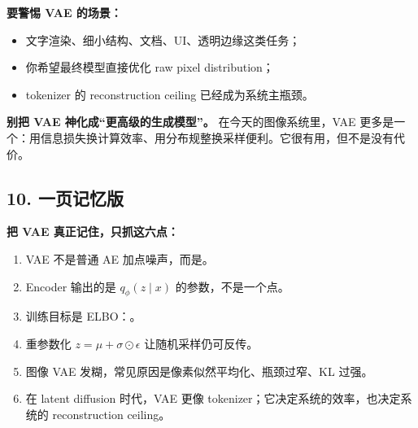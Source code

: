 \textbf{要警惕 VAE 的场景：}

\begin{itemize}[leftmargin=1.5em]
  \item 文字渲染、细小结构、文档、UI、透明边缘这类任务；
  \item 你希望最终模型直接优化 raw pixel distribution；
  \item tokenizer 的 reconstruction ceiling 已经成为系统主瓶颈。
\end{itemize}

\begin{warnbox}
\textbf{别把 VAE 神化成“更高级的生成模型”。} 在今天的图像系统里，VAE 更多是一个：用信息损失换计算效率、用分布规整换采样便利。它很有用，但不是没有代价。
\end{warnbox}

\subsection{10. 一页记忆版}

\begin{summarybox}
\textbf{把 VAE 真正记住，只抓这六点：}
\begin{enumerate}[leftmargin=1.8em]
  \item VAE 不是普通 AE 加点噪声，而是。
  \item Encoder 输出的是 $q_\phi(z\mid x)$ 的参数，不是一个点。
  \item 训练目标是 ELBO：。
  \item 重参数化 $z=\mu+\sigma\odot\epsilon$ 让随机采样仍可反传。
  \item 图像 VAE 发糊，常见原因是像素似然平均化、瓶颈过窄、KL 过强。
  \item 在 latent diffusion 时代，VAE 更像 tokenizer；它决定系统的效率，也决定系统的 reconstruction ceiling。
\end{enumerate}
\end{summarybox}
